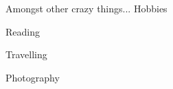 

\begin{cventries}

  \cventry
    {Amongst other crazy things...} %
    {Hobbies} %
    {} %
    {} %
    {
      \begin{cvitems} %
        \item {Reading}
        \item {Travelling}
        \item {Photography}
      \end{cvitems}
    }


\end{cventries}
